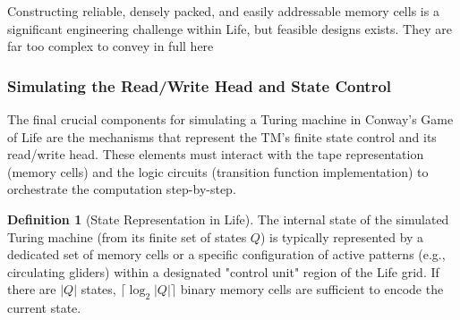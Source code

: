 \documentclass{article}
\theoremstyle{definition}
\newtheorem{definition}{Definition}[section]
\theoremstyle{plain}
\theoremstyle{plain}
\begin{document}
Constructing reliable, densely packed, and easily addressable memory cells is a significant engineering challenge within Life, but feasible designs exists. They are far too complex to convey in full here

\subsubsection{Simulating the Read/Write Head and State Control}

The final crucial components for simulating a Turing machine in Conway's Game of Life are the mechanisms that represent the TM's finite state control and its read/write head. These elements must interact with the tape representation (memory cells) and the logic circuits (transition function implementation) to orchestrate the computation step-by-step.

\begin{definition}[State Representation in Life]
The internal state of the simulated Turing machine (from its finite set of states $Q$) is typically represented by a dedicated set of memory cells or a specific configuration of active patterns (e.g., circulating gliders) within a designated "control unit" region of the Life grid. If there are $|Q|$ states, $\lceil \log_2 |Q| \rceil$ binary memory cells are sufficient to encode the current state.
\end{definition}
\end{document}
